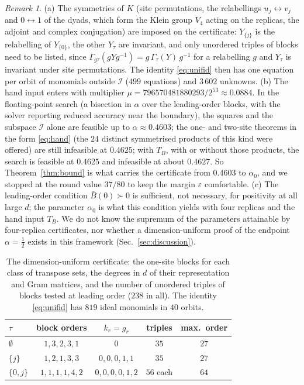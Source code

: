 \documentclass[aps,pra,twocolumn,superscriptaddress,nofootinbib,longbibliography]{revtex4-2}
\theoremstyle{plain}
\theoremstyle{definition}
\theoremstyle{remark}
\newtheorem{remark}[theorem]{Remark}
\begin{document}
\begin{remark}\label{rem:unif}
(a) The symmetries of $K$ (site permutations, the relabellings $u_j\leftrightarrow v_j$ and $0\leftrightarrow1$ of the dyads, which form the Klein group $V_4$ acting on the replicas, the adjoint and complex conjugation) are imposed on the certificate: $Y_{\{j\}}$ is the relabelling of $Y_{\{0\}}$, the other $Y_\tau$ are invariant, and only unordered triples of blocks need to be listed, since $\Gamma_{g\tau}(gYg^{-1})=g\,\Gamma_\tau(Y)\,g^{-1}$ for a relabelling $g$ and $Y_\tau$ is invariant under site permutations. The identity \eqref{eq:unifid} then has one equation per orbit of monomials outside $\mathcal I$ ($499$ equations) and $3\,602$ unknowns.
(b) The hand input enters with multiplier $\mu=796570481880293/2^{53}\approx0.0884$. In the floating-point search (a bisection in $\alpha$ over the leading-order blocks, with the solver reporting reduced accuracy near the boundary), the squares and the subspace $\mathcal I$ alone are feasible up to $\alpha\approx0.4603$; the one- and two-site theorems in the form \eqref{eq:hand} (the $24$ distinct symmetrised products of this kind were offered) are still infeasible at $0.4625$; with $T_B$, with or without those products, the search is feasible at $0.4625$ and infeasible at about $0.4627$. So Theorem~\ref{thm:bound} is what carries the certificate from $0.4603$ to $\alpha_0$, and we stopped at the round value $37/80$ to keep the margin $\varepsilon$ comfortable.
(c) The leading-order condition $\bar B(0)\succ0$ is sufficient, not necessary, for positivity at all large $d$; the parameter $\alpha_0$ is what this condition yields with four replicas and the hand input $T_B$. We do not know the supremum of the parameters attainable by four-replica certificates, nor whether a dimension-uniform proof of the endpoint $\alpha=\tfrac12$ exists in this framework (Sec.~\ref{sec:discussion}).
\end{remark}

\begin{table}[t]
\footnotesize\setlength{\tabcolsep}{6pt}
\begin{tabular}{lcccc}
\toprule
$\tau$ & block orders & $k_r=g_r$ & triples & max.\ order\\
\midrule
$\emptyset$ & $1,3,2,3,1$ & $0$ & $35$ & $27$\\
$\{j\}$ & $1,2,1,3,3$ & $0,0,0,1,1$ & $35$ & $27$\\
$\{0,j\}$ & $1,1,1,1,4,2$ & $0,0,0,0,1,2$ & $56$ each & $64$\\
\bottomrule
\end{tabular}
\caption{The dimension-uniform certificate: the one-site blocks for each class of transpose sets, the degrees in $d$ of their representation and Gram matrices, and the number of unordered triples of blocks tested at leading order ($238$ in all). The identity \eqref{eq:unifid} has $819$ ideal monomials in $40$ orbits.}\label{tab:unif}
\end{table}
\end{document}
